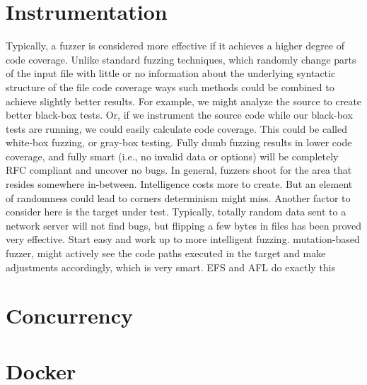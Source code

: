 \section{Instrumentation}
Typically, a fuzzer is considered more effective if it achieves a higher degree of code coverage. 
Unlike standard fuzzing techniques, which randomly change parts of the input file with little or no information about the underlying syntactic structure of the file
code coverage
 ways such methods could be combined to achieve
slightly better results. For example, we might analyze the source to create better
black-box tests. Or, if we instrument the source code while our black-box tests are
running, we could easily calculate code coverage. This could be called white-box
fuzzing, or gray-box testing.
Fully dumb
fuzzing results in lower code coverage, and fully smart (i.e., no invalid data or
options) will be completely RFC compliant and uncover no bugs. In general,
fuzzers shoot for the area that resides somewhere in-between. Intelligence costs
more to create. But an element of randomness could lead to corners determinism
might miss.
Another factor to consider here is the target under test. Typically, totally random
data sent to a network server will not find bugs, but flipping a few bytes in files
has been proved very effective. Start easy and work up to more intelligent fuzzing.
mutation-based
fuzzer, might actively see the code paths executed in the target and make adjustments
accordingly, which is very smart. EFS and AFL do exactly this
\section{Concurrency}

\section{Docker}
